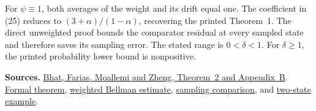 \documentclass[12pt,a4paper]{article}
\begin{document}
For \(\psi\equiv1\), both averages of the weight and its drift equal one.
The coefficient in (25) reduces to \((3+\alpha)/(1-\alpha)\), recovering
the printed Theorem~1. The direct unweighted proof bounds the comparator
residual at every sampled state and therefore saves its sampling error.
The stated range is \(0<\delta<1\). For \(\delta\ge1\),
the printed probability lower bound is nonpositive.

{\small\textbf{Sources.}
\href{https://moallemi.com/ciamac/papers/kernel-adp-2012.pdf\#page=28}{Bhat, Farias, Moallemi and Zheng, Theorem~2 and Appendix~B}.
\href{https://github.com/nikhilpb/kadp/blob/main/lean/Theorem2.lean}{Formal theorem},
\href{https://github.com/nikhilpb/kadp/blob/main/lean/Weighted.lean}{weighted Bellman estimate},
\href{https://github.com/nikhilpb/kadp/blob/main/lean/PopulationComparison.lean}{sampling comparison},
and \href{https://github.com/nikhilpb/kadp/blob/main/lean/Examples/Theorem2.lean}{two-state example}.}
\end{document}
